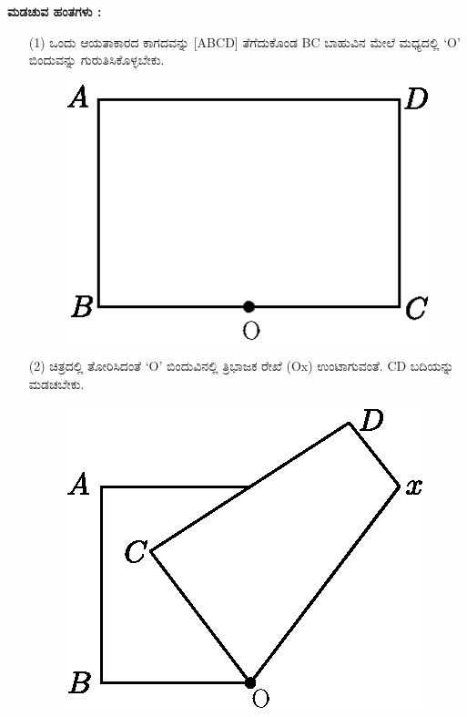 \textbf{ಮಡಚುವ ಹಂತಗಳು :}
\begin{enumerate}
\item[(1)] ಒಂದು ಆಯತಾಕಾರದ ಕಾಗದವನ್ನು [ABCD] ತೆಗೆದುಕೊಂಡ BC ಬಾಹುವಿನ ಮೇಲೆ ಮಧ್ಯದಲ್ಲಿ `O' ಬಿಂದುವನ್ನು ಗುರುತಿಸಿಕೊಳ್ಳಬೇಕು. 
\begin{figure}[H]
\centering
\includegraphics[scale=.98]{src/figure/chap1/fig1-9a.eps}
\end{figure}

\item[(2)] ಚಿತ್ರದಲ್ಲಿ ತೋರಿಸಿದಂತೆ  `O' ಬಿಂದುವಿನಲ್ಲಿ ತ್ರಿಭಾಜಕ ರೇಖೆ (Ox) ಉಂಟಾಗುವಂತೆ. CD ಬದಿಯನ್ನು ಮಡಚಬೇಕು.  
\begin{figure}[H]
\centering
\includegraphics[scale=.98]{src/figure/chap1/fig1-9b.eps}
\end{figure}


\end{enumerate}
